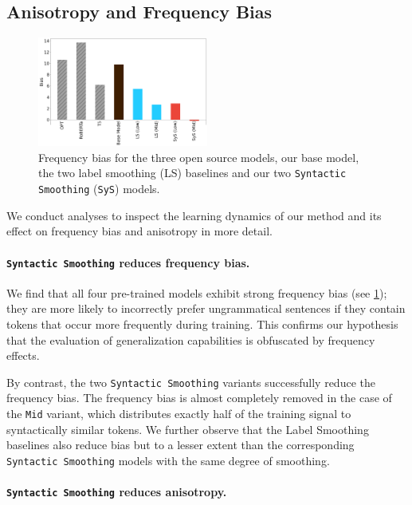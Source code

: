 \subsection{Anisotropy and Frequency Bias}

\begin{figure}
    \centering
    \includegraphics[width=0.5\textwidth]{chapters/syntatic-smoothing/figures/biases.png}
    \caption{Frequency bias for the three open source models, our base model, the two label smoothing (LS) baselines and our two \texttt{Syntactic Smoothing} (\texttt{SyS}) models.}
    \label{fig:biases}
\end{figure}

We conduct analyses to inspect the learning dynamics of our method and its effect on frequency bias and anisotropy in more detail. 

\paragraph{\texttt{Syntactic Smoothing} reduces frequency bias.}
We find that all four pre-trained models exhibit strong frequency bias (see \cref{fig:biases}); they are more likely to incorrectly prefer ungrammatical sentences if they contain tokens that occur more frequently during training. This confirms our hypothesis that the evaluation of generalization capabilities is obfuscated by frequency effects. 

By contrast, the two \texttt{Syntactic Smoothing} variants successfully reduce the frequency bias. The frequency bias is almost completely removed in the case of the \texttt{Mid} variant, which distributes exactly half of the training signal to syntactically similar tokens. We further observe that the Label Smoothing baselines also reduce bias but to a lesser extent than the corresponding \texttt{Syntactic Smoothing} models with the same degree of smoothing. 


\paragraph{\texttt{Syntactic Smoothing} reduces anisotropy.}

